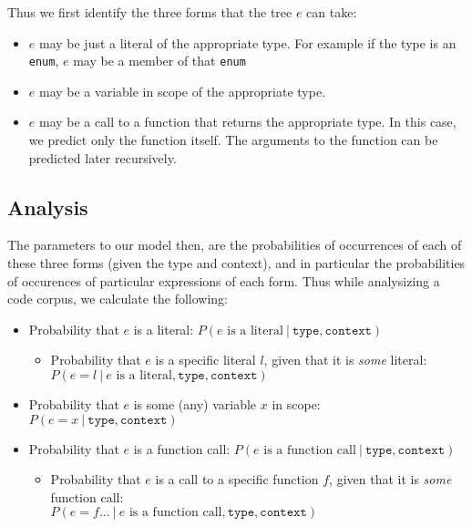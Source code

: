 \documentclass{article} %
\begin{document}
Thus we first identify the three forms that the tree $e$ can take:
\begin{itemize}
  \item $e$ may be just a literal of the appropriate type. For example if the type is an \texttt{enum}, $e$ may be a member of that \texttt{enum}
  \item $e$ may be a variable in scope of the appropriate type.
  \item $e$ may be a call to a function that returns the appropriate type. In this case, we predict only the function itself. The arguments to the function can be predicted later recursively.
\end{itemize}

\subsection*{Analysis}
The parameters to our model then, are the probabilities of occurrences of each of these three forms (given the type and context), and in particular the probabilities of occurences of particular expressions of each form. Thus while analysizing a code corpus, we calculate the following:
\begin{itemize}
  \item Probability that $e$ is a literal: $P(e \text{ is a literal} ~|~  \texttt{type} , \texttt{context} ) $
    \begin{itemize}
      \item Probability that $e$ is a specific literal $l$, given that it is \emph{some} literal: \\$P(e = l ~|~ e \text{ is a literal},  \texttt{type} , \texttt{context} )$
    \end{itemize}
  \item Probability that $e$ is some (any) variable $x$ in scope: $P(e = x ~|~ \texttt{type} , \texttt{context})$
  \item Probability that $e$ is a function call: $P(e \text{ is a function call} ~|~  \texttt{type} , \texttt{context} ) $
    \begin{itemize}
      \item Probability that $e$ is a call to a specific function $f$, given that it is \emph{some} function call: \\$P(e = f \ldots ~|~ e \text{ is a function call},  \texttt{type} , \texttt{context} )$
    \end{itemize}
\end{itemize}
\end{document}
